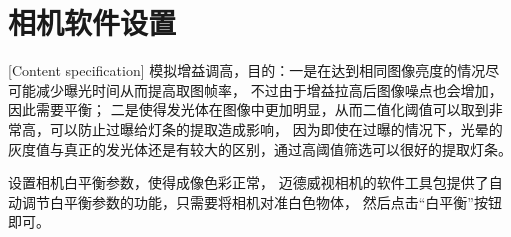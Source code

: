 \section{相机软件设置}[Content specification]
模拟增益调高，目的：一是在达到相同图像亮度的情况尽可能减少曝光时间从而提高取图帧率，
不过由于增益拉高后图像噪点也会增加，因此需要平衡； 
二是使得发光体在图像中更加明显，从而二值化阈值可以取到非常高，可以防止过曝给灯条的提取造成影响，
因为即使在过曝的情况下，光晕的灰度值与真正的发光体还是有较大的区别，通过高阈值筛选可以很好的提取灯条。

设置相机白平衡参数，使得成像色彩正常，
迈德威视相机的软件工具包提供了自动调节白平衡参数的功能，只需要将相机对准白色物体，
然后点击“白平衡”按钮即可。